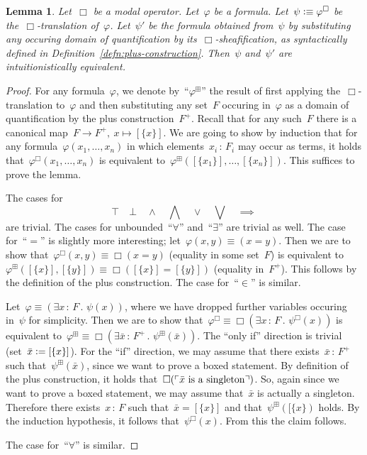 \documentclass[10pt]{amsart}
\theoremstyle{definition}
\theoremstyle{plain}
\newtheorem{lemma}[defn]{Lemma}
\theoremstyle{remark}
\newcommand{\?}{\,{:}\,}
\renewcommand{\_}{\mathpunct{.}\,}
\newcommand{\speak}[1]{\ulcorner\text{\textnormal{#1}}\urcorner}
\newcommand{\defeq}{\vcentcolon=}
\newcommand{\defequiv}{\vcentcolon\equiv}
\begin{document}
\begin{lemma}Let~$\Box$ be a modal operator. Let~$\varphi$ be a formula.
Let~$\psi \defequiv \varphi^\Box$ be the~$\Box$-translation of~$\varphi$.
Let~$\psi'$ be the formula obtained from~$\psi$ by substituting any occuring
domain of quantification by its~$\Box$-sheafification, as syntactically defined
in Definition~\ref{defn:plus-construction}. Then~$\psi$
and~$\psi'$ are intuitionistically equivalent.
\end{lemma}
\begin{proof}
For any formula~$\varphi$, we denote by~``$\varphi^\boxplus$'' the result of
first applying the~$\Box$-translation to~$\varphi$ and then substituting any
set~$F$ occuring in~$\varphi$ as a domain of quantification by the plus
construction~$F^+$. Recall that for any such~$F$ there is a canonical map~$F
\to F^+,\ x \mapsto [\{x\}]$. We are going to show by induction that for any
formula~$\varphi(x_1,\ldots,x_n)$ in which elements~$x_i\?F_i$ may occur as
terms, it holds that~$\varphi^\Box(x_1,\ldots,x_n)$ is equivalent
to~$\varphi^\boxplus([\{x_1\}],\ldots,[\{x_n\}])$. This suffices to prove the
lemma.

The cases for
\[ \top \quad \bot \quad \wedge \quad \bigwedge \quad \vee \quad \bigvee \quad \implies \]
are trivial. The cases for unbounded~``$\forall$'' and~``$\exists$'' are
trivial as well. The case for~``$=$'' is slightly more interesting; let~$\varphi(x,y)
\equiv (x = y)$. Then we are to show that~$\varphi^\Box(x,y) \equiv \Box(x=y)$
(equality in some set~$F$) is equivalent to~$\varphi^\boxplus([\{x\}],[\{y\}])
\equiv \Box([\{x\}] = [\{y\}])$ (equality in~$F^+$). This follows by the
definition of the plus construction. The case for~``$\in$'' is similar.

Let~$\varphi \equiv (\exists x\?F\_ \psi(x))$, where we have dropped further
variables occuring in~$\psi$ for simplicity. Then we are to show
that~$\varphi^\Box \equiv \Box(\exists x\?F\_ \psi^\Box(x))$ is equivalent
to~$\varphi^\boxplus \equiv \Box(\exists \bar x\?F^+\_ \psi^\boxplus(\bar x))$.
The ``only if'' direction is trivial (set~$\bar x \defeq [\{x\}]$). For the ``if''
direction, we may assume that there exists~$\bar x\?F^+$ such
that~$\psi^\boxplus(\bar x)$, since we want to prove a boxed statement. By
definition of the plus construction, it holds that~$\Box(\speak{$\bar x$ is a
singleton})$. So, again since we want to prove a boxed statement, we may assume
that~$\bar x$ is actually a singleton. Therefore there exists~$x\?F$ such
that~$\bar x = [\{x\}]$ and that~$\psi^\boxplus([\{x\})$ holds. By the induction
hypothesis, it follows that~$\psi^\Box(x)$. From this the claim follows.

The case for~``$\forall$'' is similar.
\end{proof}
\end{document}
